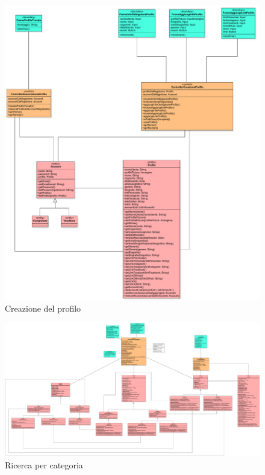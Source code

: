             \begin{figure}[htbp!]
                \centering
                    \includegraphics[width=1\linewidth]{Immagini/Diagrammi/Class Diagram/Analisi/Utente che non ha effettuato l'accesso/CreazioneProfilo.pdf}
                \caption{Creazione del profilo}
            \end{figure}
            
            \begin{figure}[htbp!]
                \centering
                    \includegraphics[width=1\linewidth]{Immagini/Diagrammi/Class Diagram/Analisi/Utente generico/RicercaCategoria.pdf}
                \caption{Ricerca per categoria}
            \end{figure}
            
